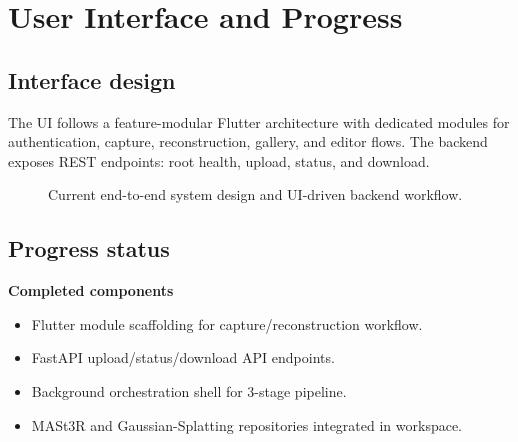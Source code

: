 \documentclass[10pt,twocolumn,letterpaper]{article}
\begin{document}
\section{User Interface and Progress}
\subsection{Interface design}
The UI follows a feature-modular Flutter architecture with dedicated modules for authentication, capture, reconstruction, gallery, and editor flows. The backend exposes REST endpoints: root health, upload, status, and download.

\begin{figure}[t]
\centering
{}
\caption{Current end-to-end system design and UI-driven backend workflow.}
\label{fig:block}
\end{figure}

\subsection{Progress status}

\textbf{Completed components}
\begin{itemize}[leftmargin=*]
    \item Flutter module scaffolding for capture/reconstruction workflow.
    \item FastAPI upload/status/download API endpoints.
    \item Background orchestration shell for 3-stage pipeline.
    \item MASt3R and Gaussian-Splatting repositories integrated in workspace.
\end{itemize}
\end{document}
